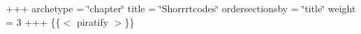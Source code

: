 +++ archetype = \char`\"{}chapter\char`\"{} title = \char`\"{}\+Shorrrtcodes\char`\"{} ordersectionsby = \char`\"{}title\char`\"{} weight = 3 +++ \{\{$<$ piratify $>$\}\} 